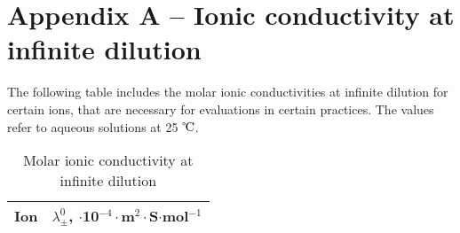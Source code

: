 \fancyhead[LO,RE]{\thesection}
\fancyfoot[LE,RO]{\thepage}

\section*{Appendix A -- Ionic conductivity at infinite dilution}
The following table includes the molar ionic conductivities at infinite dilution for certain ions, that are necessary for evaluations in certain practices. The values refer to aqueous solutions at 25 $\celsius$.

\begin{table}[h!]
\centering
\caption{Molar ionic conductivity at infinite dilution}
\label{table:conductivities}
\begin{tabular}{|l|c|}
\hline
                        Ion & $\lambda^0_\pm$, $\cdot$10$^{-4}\cdot$m$^2 \cdot$S$\cdot$mol$^{-1}$\\
                      \hline



\end{tabular}
\end{table}
